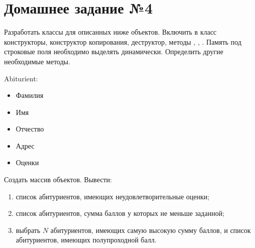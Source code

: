 \section*{Домашнее задание №4}

Разработать классы для описанных ниже объектов. Включить в класс
конструкторы, конструктор копирования, деструктор, методы ,
, . Память под строковые поля необходимо выделять
динамически. Определить другие необходимые методы.

Abiturient:
\begin{itemize}
	\item Фамилия
	\item Имя
	\item Отчество
	\item Адрес
	\item Оценки
\end{itemize}

Создать массив объектов. Вывести:
\begin{enumerate}
	\item список абитуриентов, имеющих неудовлетворительные оценки;
	\item список абитуриентов, сумма баллов у которых не меньше заданной;
	\item выбрать $N$ абитуриентов, имеющих самую высокую сумму баллов, и
		список абитуриентов, имеющих полупроходной балл.
\end{enumerate}
